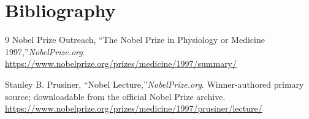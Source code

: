 \section{Bibliography}

\begin{thebibliography}{9}
Nobel Prize Outreach, ``The Nobel Prize in Physiology or Medicine 1997,''\emph{NobelPrize.org}.\\
\url{https://www.nobelprize.org/prizes/medicine/1997/summary/}

Stanley B. Prusiner, ``Nobel Lecture,''\emph{NobelPrize.org}. Winner-authored primary source; downloadable from the official Nobel Prize archive.\\
\url{https://www.nobelprize.org/prizes/medicine/1997/prusiner/lecture/}
\end{thebibliography}

